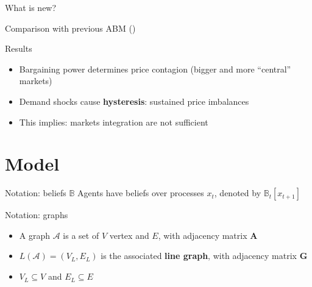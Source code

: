 \documentclass{beamer}
\newcommand{\B}{\mathbb{B}}
\newcommand{\matr}[1]{\bm{#1}}
\begin{document}
\begin{frame}{What is new?}

    Comparison with previous ABM (\cite{Weidlich2008})
    \vfill

    \hfill
\end{frame}

\begin{frame}{Results}
    \begin{itemize} \setlength\itemsep{1.5em}
              \pause \item Bargaining power determines price contagion (bigger and more ``central'' markets)
              \pause \item Demand shocks cause \textbf{hysteresis}: sustained price imbalances
              \pause \item This implies: markets integration are not sufficient
    \end{itemize}
\end{frame}

\section{Model}

\begin{frame}{Notation: beliefs $\B$}
    Agents have beliefs over processes $x_t$, denoted by $\B_t[x_{t+1}]$
\end{frame}

\begin{frame}{Notation: graphs}
    \begin{itemize} \setlength\itemsep{1.5em}
        \item A graph $\mathcal{A}$ is a set of $V$ vertex and $E$, with adjacency matrix $\matr{A}$ \pause
        \item $L(\mathcal{A}) = (V_L, E_L)$ is the associated \textbf{line graph}, with adjacency matrix $\matr{G}$ \pause
        \item $V_L \subseteq V$ and $E_L \subseteq E$ \pause
    \end{itemize}
    \begin{center}
        \resizebox{!}{0.4\textheight}{}
    \end{center}
\end{frame}
\end{document}
